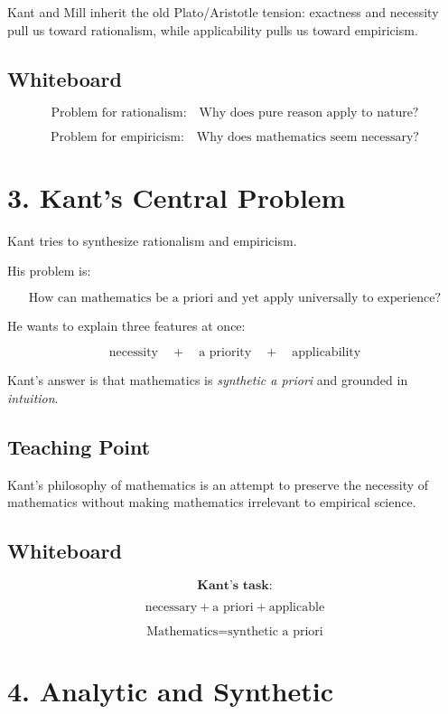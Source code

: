 \documentclass[11pt]{article}
\begin{document}
Kant and Mill inherit the old Plato/Aristotle tension: exactness and necessity pull us
toward rationalism, while applicability pulls us toward empiricism.

\subsection*{Whiteboard}

\[
\text{Problem for rationalism:}
\quad
\text{Why does pure reason apply to nature?}
\]

\[
\text{Problem for empiricism:}
\quad
\text{Why does mathematics seem necessary?}
\]

\section*{3. Kant's Central Problem}

Kant tries to synthesize rationalism and empiricism.

His problem is:

\[
\boxed{
\text{How can mathematics be a priori and yet apply universally to experience?}
}
\]

He wants to explain three features at once:

\[
\text{necessity}
\quad + \quad
\text{a priority}
\quad + \quad
\text{applicability}
\]

Kant's answer is that mathematics is \emph{synthetic a priori} and grounded in
\emph{intuition}.

\subsection*{Teaching Point}

Kant's philosophy of mathematics is an attempt to preserve the necessity of mathematics
without making mathematics irrelevant to empirical science.

\subsection*{Whiteboard}

\[
\textbf{Kant's task:}
\]

\[
\text{necessary}
+
\text{a priori}
+
\text{applicable}
\]

\[
\boxed{
\text{Mathematics} = \text{synthetic a priori}
}
\]

\section*{4. Analytic and Synthetic}
\end{document}
